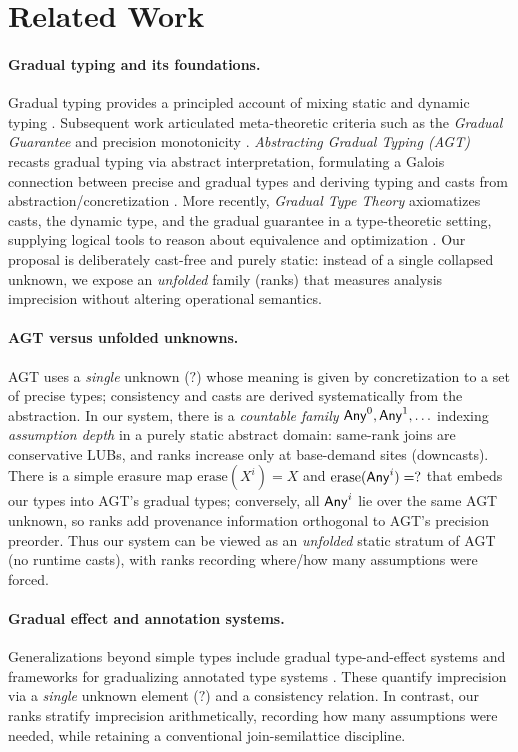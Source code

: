 \section{Related Work}
\label{sec:related}

\paragraph{Gradual typing and its foundations.}
Gradual typing provides a principled account of mixing static and dynamic typing \cite{SiekTaha2006}. Subsequent work articulated meta-theoretic criteria such as the \emph{Gradual Guarantee} and precision monotonicity \cite{SiekGarciaTaha2015}. \emph{Abstracting Gradual Typing (AGT)} recasts gradual typing via abstract interpretation, formulating a Galois connection between precise and gradual types and deriving typing and casts from abstraction/concretization \cite{GarciaClarkTanter2016}. More recently, \emph{Gradual Type Theory} axiomatizes casts, the dynamic type, and the gradual guarantee in a type-theoretic setting, supplying logical tools to reason about equivalence and optimization \cite{NewLicataAhmed2021}. Our proposal is deliberately cast-free and purely static: instead of a single collapsed unknown, we expose an \emph{unfolded} family (ranks) that measures analysis imprecision without altering operational semantics.

\paragraph{AGT versus unfolded unknowns.}
AGT uses a \emph{single} unknown ($?$) whose meaning is given by concretization to a set of precise types; consistency and casts are derived systematically from the abstraction. In our system, there is a \emph{countable family} $\mathsf{Any}^{0},\mathsf{Any}^{1},\ldots$ indexing \emph{assumption depth} in a purely static abstract domain: same-rank joins are conservative LUBs, and ranks increase only at base-demand sites (downcasts). There is a simple erasure map $\mathrm{erase}(X^{i})=X$ and $\mathrm{erase}(\mathsf{Any}^{i})=?$ that embeds our types into AGT’s gradual types; conversely, all $\mathsf{Any}^{i}$ lie over the same AGT unknown, so ranks add provenance information orthogonal to AGT’s precision preorder. Thus our system can be viewed as an \emph{unfolded} static stratum of AGT (no runtime casts), with ranks recording where/how many assumptions were forced.

\paragraph{Gradual effect and annotation systems.}
Generalizations beyond simple types include gradual type-and-effect systems \cite{BanadosSchwerterGarciaTanter2016} and frameworks for gradualizing annotated type systems \cite{ThiemannFennell2014}. These quantify imprecision via a \emph{single} unknown element ($?$) and a consistency relation. In contrast, our ranks stratify imprecision arithmetically, recording how many assumptions were needed, while retaining a conventional join-semilattice discipline.

